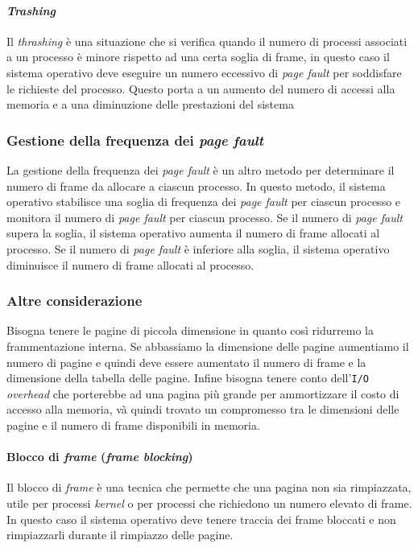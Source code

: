         \paragraph{\textit{Trashing}}
            Il \textit{thrashing} è una situazione che si verifica quando il numero di processi associati a un processo è minore rispetto ad una certa soglia di frame, in questo caso il sistema operativo deve eseguire un numero eccessivo di \textit{page fault} per soddisfare le richieste del processo. Questo porta a un aumento del numero di accessi alla memoria e a una diminuzione delle prestazioni del sistema
    \subsubsection{Gestione della frequenza dei \textit{page fault}}
        La gestione della frequenza dei \textit{page fault} è un altro metodo per determinare il numero di frame da allocare a ciascun processo. In questo metodo, il sistema operativo stabilisce una soglia di frequenza dei \textit{page fault} per ciascun processo e monitora il numero di \textit{page fault} per ciascun processo. Se il numero di \textit{page fault} supera la soglia, il sistema operativo aumenta il numero di frame allocati al processo. Se il numero di \textit{page fault} è inferiore alla soglia, il sistema operativo diminuisce il numero di frame allocati al processo. 
    \subsubsection{Altre considerazione}
        Bisogna tenere le pagine di piccola dimensione in quanto così ridurremo la frammentazione interna. Se abbassiamo la dimensione delle pagine aumentiamo il numero di pagine e quindi deve essere aumentato il numero di frame e la dimensione della tabella delle pagine. Infine bisogna tenere conto dell'\texttt{I/O} \textit{overhead} che porterebbe ad una pagina più grande per ammortizzare il costo di accesso alla memoria, và quindi trovato un compromesso tra le dimensioni delle pagine e il numero di frame disponibili in memoria.
        \paragraph{Blocco di \textit{frame} (\textit{frame blocking})}
            Il blocco di \textit{frame} è una tecnica che permette che una pagina non sia rimpiazzata, utile per processi \textit{kernel} o per processi che richiedono un numero elevato di frame. In questo caso il sistema operativo deve tenere traccia dei frame bloccati e non rimpiazzarli durante il rimpiazzo delle pagine.